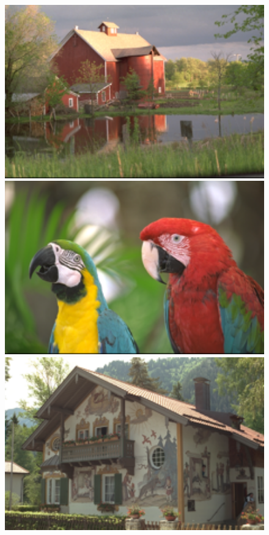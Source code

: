 \documentclass[10pt,twocolumn,letterpaper,sort&compress]{article}
\begin{document}
\begin{figure}
{\begin{minipage}{0.075\textwidth}
\end{minipage}
\begin{minipage}{0.075\textwidth}
\includegraphics[width=1\textwidth]{24images/resize_kodim22.png}
\end{minipage}
\begin{minipage}{0.075\textwidth}
\includegraphics[width=1\textwidth]{24images/resize_kodim23.png}
\end{minipage}
\begin{minipage}{0.075\textwidth}
\includegraphics[width=1\textwidth]{24images/resize_kodim24.png}

\end{minipage}}
\end{figure}
\end{document}
